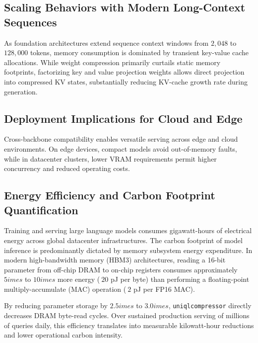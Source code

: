 \subsection{Scaling Behaviors with Modern Long-Context Sequences}
As foundation architectures extend sequence context windows from $2{,}048$ to $128{,}000$ tokens, memory consumption is dominated by transient key-value cache allocations. While weight compression primarily curtails static memory footprints, factorizing key and value projection weights allows direct projection into compressed KV states, substantially reducing KV-cache growth rate during generation.

\subsection{Deployment Implications for Cloud and Edge}
Cross-backbone compatibility enables versatile serving across edge and cloud environments. On edge devices, compact models avoid out-of-memory faults, while in datacenter clusters, lower VRAM requirements permit higher concurrency and reduced operating costs.

\subsection{Energy Efficiency and Carbon Footprint Quantification}
Training and serving large language models consumes gigawatt-hours of electrical energy across global datacenter infrastructures. The carbon footprint of model inference is predominantly dictated by memory subsystem energy expenditure. In modern high-bandwidth memory (HBM3) architectures, reading a 16-bit parameter from off-chip DRAM to on-chip registers consumes approximately $5	imes$ to $10	imes$ more energy ($~20$ pJ per byte) than performing a floating-point multiply-accumulate (MAC) operation ($~2$ pJ per FP16 MAC).

By reducing parameter storage by $2.5	imes$ to $3.0	imes$, \texttt{uniqlcompressor} directly decreases DRAM byte-read cycles. Over sustained production serving of millions of queries daily, this efficiency translates into measurable kilowatt-hour reductions and lower operational carbon intensity.
